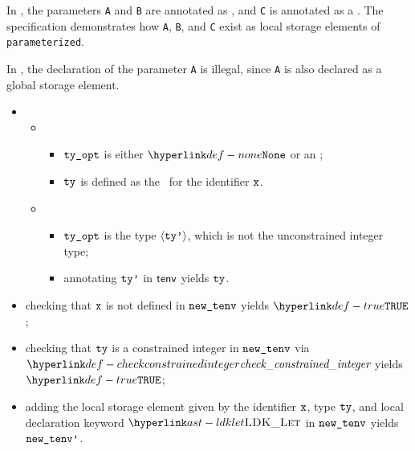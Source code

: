 In ,
the parameters \verb|A| and \verb|B| are annotated as \parameterizedintegertypes,
and \verb|C| is annotated as a \wellconstrainedintegertype.
The specification demonstrates how \verb|A|, \verb|B|, and \verb|C| exist as local storage elements
of \verb|parameterized|.

In , the declaration of the parameter \verb|A| is illegal,
since \verb|A| is also declared as a global storage element.

\ProseParagraph
\AllApply
\begin{itemize}
  \item \OneApplies
  \begin{itemize}
    \item {}
    \begin{itemize}
      \item $\texttt{ty\_opt}$ is either $\None$ or an \unconstrainedintegertype{};
      \item $\texttt{ty}$ is defined as the \parameterizedintegertype\ for the identifier $\texttt{x}$.
    \end{itemize}

    \item {}
    \begin{itemize}
      \item $\texttt{ty\_opt}$ is the type $\langle\texttt{ty'}\rangle$, which is not the unconstrained integer type;
      \item annotating $\texttt{ty'}$ in $\textsf{tenv}$ yields $\texttt{ty}$\ProseOrTypeError.
    \end{itemize}
  \end{itemize}
  \item checking that $\texttt{x}$ is not defined in $\texttt{new\_tenv}$ yields $\True$\ProseOrTypeError;
  \item checking that $\texttt{ty}$ is a constrained integer in $\texttt{new\_tenv}$ via $\checkconstrainedinteger$
        yields $\True$\ProseOrTypeError;
  \item adding the local storage element given by the identifier $\texttt{x}$, type $\texttt{ty}$, and local declaration keyword
        $\LDKLet$ in $\texttt{new\_tenv}$ yields $\texttt{new\_tenv'}$.
\end{itemize}

